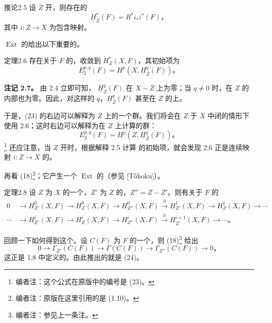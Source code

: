 \begin{SGAresult}{推论}{2.5}
设 $Z$ 开，则存在的
\[
\underline H_Z^*(F)=R^*i_*i^*(F)，\tag{22}
\]
其中 $i:Z\to X$ 为包含映射。
\end{SGAresult}
$\operatorname{Ext}$ 的给出以下重要的。
\begin{SGAresult}{定理}{2.6}
存在关于 $F$ 的，收敛到 $H_Z^*(X,F)$，其初始项为
\[
E_2^{p,q}(F)=H^p(X,\underline H_Z^q(F))。\tag{23}
\]
\end{SGAresult}
\textbf{注记 2.7。}
由 2.4 立即可知， $\underline H_Z^q(F)$ 在 $X-\overline Z$ 上为零；当 $q\ne0$ 时，在 $Z$ 的内部也为零。因此，对这样的 $q$，$\underline H_Z^q(F)$ 甚至在 $Z$ 的上。

于是，(23) 的右边可以解释为 $\overline Z$ 上的一个群。我们将会在 $Z$ 于 $X$ 中闭的情形下使用 2.6；这时右边可以解释为在 $Z$ 上计算的群：
\[
E_2^{p,q}(F)=H^p(Z,\underline H_Z^q(F))。\tag{23 bis}
\]
\footnote{编者注：这个公式在原版中的编号是 (23)。}
还应注意，当 $Z$ 开时，根据解释 2.5 计算 的初始项，就会发现 2.6 正是连续映射 $i:Z\to X$ 的。

再看 (18)\footnote{编者注：原版在这里引用的是 (1.10)。}；它产生一个 $\operatorname{Ext}$ 的（参见 [Tôhoku]）。
\begin{SGAresult}{定理}{2.8}
设 $Z$ 为 $X$ 的一个，$Z'$ 为 $Z$ 的，$Z''=Z-Z'$。则有关于 $F$ 的
\[
\begin{aligned}
0&\longrightarrow H_{Z'}^0(X,F)\longrightarrow H_Z^0(X,F)
\longrightarrow H_{Z''}^0(X,F)
\xrightarrow{\partial} H_{Z'}^1(X,F)\longrightarrow H_Z^1(X,F)
\longrightarrow\cdots\\
\cdots&\longrightarrow H_{Z'}^i(X,F)\longrightarrow H_Z^i(X,F)
\longrightarrow H_{Z''}^i(X,F)
\xrightarrow{\partial}H_{Z'}^{i+1}(X,F)\longrightarrow\cdots。
\end{aligned}\tag{24}
\]
\end{SGAresult}
回顾一下如何得到这个。设 $C(F)$ 为 $F$ 的一个，则 (18)\footnote{编者注：参见上一条注。} 给出
\[
0\longrightarrow\Gamma_{Z'}(C(F))\longrightarrow\Gamma(C(F))
\longrightarrow\Gamma_{Z''}(C(F))\longrightarrow0，\tag{25}
\]
这正是 1.8 中定义的。由此推出的就是 (24)。

